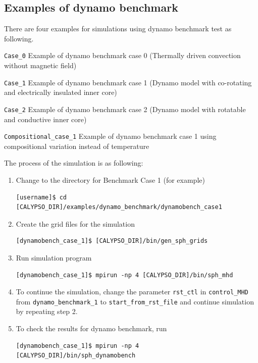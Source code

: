 \subsection{Examples of dynamo benchmark}
There are four examples for simulations using dynamo benchmark test as following.
%
\begin{description}
\item{\tt Case\_0} Example of dynamo benchmark case 0 (Thermally driven convection without magnetic field)
\item{\tt Case\_1} Example of dynamo benchmark case 1 (Dynamo model with co-rotating and electrically insulated inner core)
\item{\tt Case\_2} Example of dynamo benchmark case 2 (Dynamo model with rotatable and conductive inner core)
\item{\tt Compositional\_case\_1} Example of dynamo benchmark case 1 using compositional variation instead of temperature
\end{description}
%
The process of the simulation is as following:
%
\begin{enumerate}
\item Change to the directory for Benchmark Case 1 (for example) \\
{\small
\begin{verbatim}
[username]$ cd [CALYPSO_DIR]/examples/dynamo_benchmark/dynamobench_case1
\end{verbatim}
}

\item  Create the grid files for the simulation  \\
{\small
\begin{verbatim}
[dynamobench_case_1]$ [CALYPSO_DIR]/bin/gen_sph_grids
\end{verbatim}
}

\item  Run simulation program
{\small
\begin{verbatim}
[dynamobench_case_1]$ mpirun -np 4 [CALYPSO_DIR]/bin/sph_mhd
\end{verbatim}
}

\item  To continue the simulation, change the parameter \verb|rst_ctl| in \verb|control_MHD| from \verb|dynamo_benchmark_1| to \verb|start_from_rst_file| and continue simulation by repeating step 2.

\item  To check the results for dynamo benchmark, run 
{\small
\begin{verbatim}
[dynamobench_case_1]$ mpirun -np 4 [CALYPSO_DIR]/bin/sph_dynamobench
\end{verbatim}
}
\end{enumerate}
%

